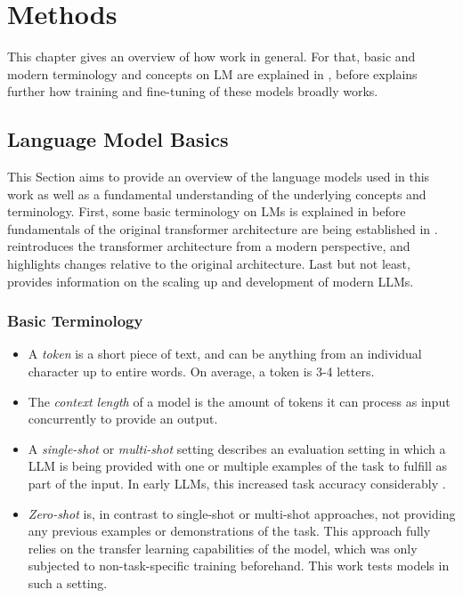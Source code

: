 \chapter{Methods}\label{chap:methods}
This chapter gives an overview of how  work in general.
For that, basic and modern terminology and concepts on \gls{LM} are explained in , before  explains further how training and fine-tuning of these models broadly works.


\section{Language Model Basics}\label{sec:basics}
This Section aims to provide an overview of the language models used in this work as well as a fundamental understanding of the underlying concepts and terminology.
First, some basic terminology on \glspl{LM} is explained in  before fundamentals of the original transformer architecture are being established in .
 reintroduces the transformer architecture from a modern perspective, and highlights changes relative to the original architecture.
Last but not least,  provides information on the scaling up and development of modern \glspl{LLM}.



\subsection{Basic Terminology}\label{sub:terminology}

\begin{itemize}
\item A \textit{token} is a short piece of text, and can be anything from an individual character up to entire words. On average, a token is 3-4 letters.
\item The \textit{context length} of a model is the amount of tokens it can process as input concurrently to provide an output.
\item A \textit{single-shot} or \textit{multi-shot} setting describes an evaluation setting in which a \gls{LLM} is being provided with one or multiple examples of the task to fulfill as part of the input. In early \glspl{LLM}, this increased task accuracy considerably \cite{brown_language_2020}.
\item \textit{Zero-shot} is, in contrast to single-shot or multi-shot approaches, not providing any previous examples or demonstrations of the task. This approach fully relies on the transfer learning capabilities of the model, which was only subjected to non-task-specific training beforehand. This work tests models in such a setting.
\end{itemize}

